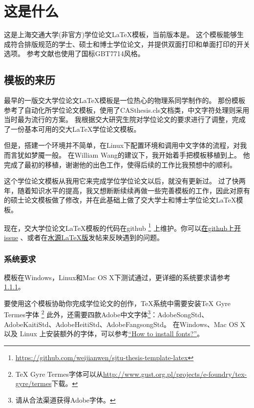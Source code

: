 
\chapter{这是什么}
\label{chap:what}

这是上海交通大学(非官方)学位论文{\LaTeX}模板，当前版本是{\version}。
这个模板能够生成符合排版规范的学士、硕士和博士学位论文，并提供双面打印和单面打印的开关选项。
参考文献也使用了国标GBT7714风格。

\section{模板的来历}

最早的一版交大学位论文{\LaTeX}模板是一位热心的物理系同学制作的。
那份模板参考了自动化所学位论文模板，使用了CASthesis.cls文档类，中文字符处理则采用当时最为流行的{\CJKLaTeX}方案。
我根据交大研究生院对学位论文的要求进行了调整，完成了一份基本可用的交大{\LaTeX}学位论文模板。

但是，搭建一个{\CJKLaTeX}环境并不简单，在Linux下配置环境和调用中文字体的流程，对我而言犹如梦魇一般。
在William Wang的建议下，我开始着手把模板移植到{\XeTeX}上。
他完成了最初的移植，谢谢他的出色工作，使得后续的工作比我预想中的顺利。

这个学位论文模板从我用它来完成学位学位论文以后，就没有更新过。
过了快两年，随着知识水平的提高，我又想断断续续再做一些完善模板的工作，因此对原有的硕士论文模板做了修改，并在此基础上做了交大学士和博士学位论文{\LaTeX}模板。

现在，交大学位论文{\LaTeX}模板的代码在github
\footnote{\url{https://github.com/weijianwen/sjtu-thesis-template-latex}}
上维护。你可以\href{https://github.com/weijianwen/sjtu-thesis-template-latex/issues}{在github上开issue}
、或者在\href{https://bbs.sjtu.edu.cn/bbsdoc?board=TeX_LaTeX}{水源LaTeX版}发帖来反映遇到的问题。

\subsection{系统要求}
\label{sec:requirements}

模板在Windows，Linux和Mac OS X下测试通过，更详细的系统要求请参考\ref{sec:requirements}。

要使用这个模板协助你完成学位论文的创作，TeX系统中需要安装TeX Gyre Termes字体
\footnote{TeX Gyre Termes字体可以从\href{http://www.gust.org.pl/projects/e-foundry/tex-gyre/termes}{http://www.gust.org.pl/projects/e-foundry/tex-gyre/termes}下载。}
此外，还需要四款Adobe中文字体\footnote{请从合法渠道获得Adobe字体。}：AdobeSongStd、AdobeKaitiStd、AdobeHeitiStd、AdobeFangsongStd。
在Windows、Mac OS X 以及 Linux 上安装额外的字体，可以参考\href{https://www.searchfreefonts.com/articles/how-to-install-fonts.htm}{“How to install fonts?”}。

